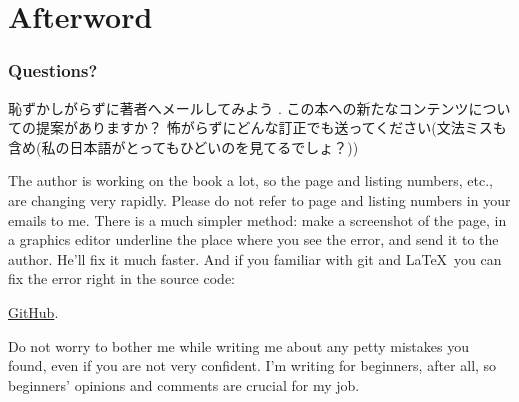 \part*{Afterword}

\section{Questions?}

恥ずかしがらずに著者へメールしてみよう
\GTT{<\EMAIL>}.
この本への新たなコンテンツについての提案がありますか？
怖がらずにどんな訂正でも送ってください(文法ミスも含め(私の日本語がとってもひどいのを見てるでしょ？))

The author is working on the book a lot, so the page and listing numbers, etc., are changing very rapidly.
Please do not refer to page and listing numbers in your emails to me.
There is a much simpler method: make a screenshot of the page, in a graphics editor underline the place where you see the error,
and send it to the author. He'll fix it much faster.
And if you familiar with git and \LaTeX\, you can fix the error right in the source code: 

\href{http://go.yurichev.com/17089}{GitHub}.

Do not worry to bother me while writing me about any petty mistakes you found, even if you are not very confident.
I'm writing for beginners, after all, so beginners' opinions and comments are crucial for my job.
